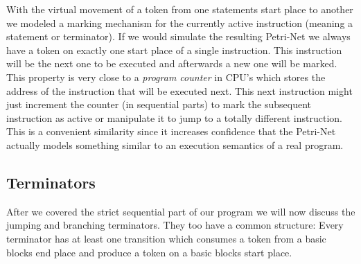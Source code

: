 With the virtual movement of a token from one statements start place to another we modeled a marking mechanism for the currently active instruction (meaning a statement or terminator).
If we would simulate the resulting Petri-Net we always have a token on exactly one start place of a single instruction.
This instruction will be the next one to be executed and afterwards a new one will be marked.
This property is very close to a \textit{program counter} in CPU's which stores the address of the instruction that will be executed next.
This next instruction might just increment the counter (in sequential parts) to mark the subsequent instruction as active or manipulate it to jump to a totally different instruction.
This is a convenient similarity since it increases confidence that the Petri-Net actually models something similar to an execution semantics of a real program.

\subsection{Terminators}
\label{terminators}
After we covered the strict sequential part of our program we will now discuss the jumping and branching terminators.
They too have a common structure:
Every terminator has at least one transition which consumes a token from a basic blocks end place and produce a token on a basic blocks start place.

